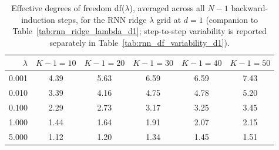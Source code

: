 \begin{table}

\caption{\label{tab:rnn_ridge_lambda_df_d1}Effective degrees of freedom df($\lambda$), averaged across all $N-1$ backward-induction steps, for the RNN ridge $\lambda$ grid at $d=1$ (companion to Table~\ref{tab:rnn_ridge_lambda_d1}; step-to-step variability is reported separately in Table~\ref{tab:rnn_df_variability_d1}).}
\footnotesize
\setlength{\tabcolsep}{4pt}
\centering
\begin{tabular}[t]{rccccc}
\toprule
$\lambda$ & $K-1=10$ & $K-1=20$ & $K-1=30$ & $K-1=40$ & $K-1=50$\\
\midrule
0.001 & 4.39 & 5.63 & 6.59 & 6.59 & 7.43\\
0.010 & 3.39 & 4.16 & 4.75 & 4.78 & 5.20\\
0.100 & 2.29 & 2.73 & 3.17 & 3.25 & 3.45\\
1.000 & 1.44 & 1.64 & 1.91 & 2.07 & 2.15\\
5.000 & 1.12 & 1.20 & 1.34 & 1.45 & 1.51\\
\bottomrule
\end{tabular}
\end{table}
